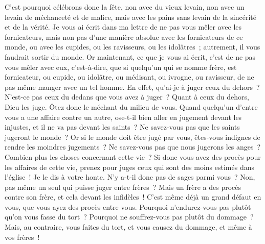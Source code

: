 \begin{multicols}{2}
C'est pourquoi célébrons donc la fête, non avec du vieux levain, non avec un levain de méchanceté et de malice, mais avec les pains sans levain de la sincérité et de la vérité.
Je vous ai écrit dans ma lettre de ne pas vous mêler avec les fornicateurs,
mais non pas d'une manière absolue avec les fornicateurs de ce monde, ou avec les cupides, ou les ravisseurs, ou les idolâtres~; autrement, il vous faudrait sortir du monde.
Or maintenant, ce que je vous ai écrit, c'est de ne pas vous mêler avec eux, c'est-à-dire, que si quelqu'un qui se nomme frère, est fornicateur, ou cupide, ou idolâtre, ou médisant, ou ivrogne, ou ravisseur, de ne pas même manger avec un tel homme.
En effet, qu'ai-je à juger ceux du dehors~? N'est-ce pas ceux du dedans que vous avez à juger~?
Quant à ceux du dehors, Dieu les juge. Ôtez donc le méchant du milieu de vous.
\VerseOne{}Quand quelqu'un d'entre vous a une affaire contre un autre, ose-t-il bien aller en jugement devant les injustes, et il ne va pas devant les saints~?
Ne savez-vous pas que les saints jugeront le monde~? Or si le monde doit être jugé par vous, êtes-vous indignes de rendre les moindres jugements~?
Ne savez-vous pas que nous jugerons les anges~? Combien plus les choses concernant cette vie~?
Si donc vous avez des procès pour les affaires de cette vie, prenez pour juges ceux qui sont des moins estimés dans l'église~!
Je le dis à votre honte. N'y a-t-il donc pas de sages parmi vous~? Non, pas même un seul qui puisse juger entre frères~?
Mais un frère a des procès contre son frère, et cela devant les infidèles~!
C'est même déjà un grand défaut en vous, que vous ayez des procès entre vous. Pourquoi n'endurez-vous pas plutôt qu'on vous fasse du tort~? Pourquoi ne souffrez-vous pas plutôt du dommage~?
Mais, au contraire, vous faites du tort, et vous causez du dommage, et même à vos frères~!

\end{multicols}
